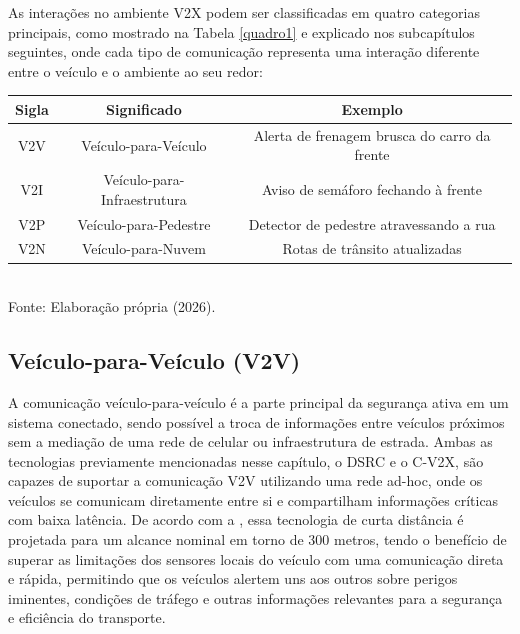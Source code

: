 As interações no ambiente V2X podem ser classificadas em quatro categorias principais, como mostrado na Tabela \ref{quadro1} e explicado nos subcapítulos 
seguintes, onde cada tipo de comunicação representa uma interação diferente entre o veículo e o ambiente ao seu redor:

\begin{quadro}[H]
\centering
\caption{Tecnologias de Comunicação Veicular}
\begin{tabular}{|c|c|c|}
\hline
\textbf{Sigla}  & \textbf{Significado}          & \textbf{Exemplo}                              \\ \hline
V2V             & Veículo-para-Veículo          & Alerta de frenagem brusca do carro da frente  \\ \hline
V2I             & Veículo-para-Infraestrutura   & Aviso de semáforo fechando à frente           \\ \hline
V2P             & Veículo-para-Pedestre         & Detector de pedestre atravessando a rua       \\ \hline
V2N             & Veículo-para-Nuvem            & Rotas de trânsito atualizadas                 \\ \hline
\end{tabular}
\label{quadro1}
\\
\small{Fonte: Elaboração própria (2026).}
\end{quadro}

\subsection{Veículo-para-Veículo (V2V)}

A comunicação veículo-para-veículo é a parte principal da segurança ativa em um sistema conectado, sendo possível a troca de informações entre veículos
próximos sem a mediação de uma rede de celular ou infraestrutura de estrada. Ambas as tecnologias previamente mencionadas nesse capítulo, o DSRC e o C-V2X,
são capazes de suportar a comunicação V2V utilizando uma rede ad-hoc, onde os veículos se comunicam diretamente entre si e compartilham informações críticas
com baixa latência. De acordo com a \cite{ref:usdot2024}, essa tecnologia de curta distância é projetada para um alcance nominal em torno de 300 metros,
tendo o benefício de superar as limitações dos sensores locais do veículo com uma comunicação direta e rápida, permitindo que os veículos alertem uns aos
outros sobre perigos iminentes, condições de tráfego e outras informações relevantes para a segurança e eficiência do transporte.

